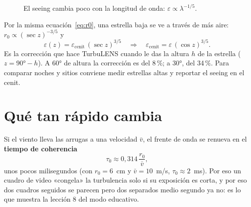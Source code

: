\begin{figure}[H]
\centering
{}
\caption{El seeing cambia poco con la longitud de onda: $\varepsilon \propto \lambda^{-1/5}$.}
\end{figure}

Por la misma ecuación~\eqref{eq:r0}, una estrella baja se ve a través de más aire: $r_0 \propto (\sec z)^{-3/5}$ y
\begin{equation}
\varepsilon(z) = \varepsilon_\text{cenit}\,(\sec z)^{3/5}
\quad\Longrightarrow\quad
\varepsilon_\text{cenit} = \varepsilon\,(\cos z)^{3/5} .
\end{equation}
Es la corrección que hace TurbuLENS cuando le das la altura $h$ de la estrella ($z = 90° - h$). A 60° de altura la
corrección es del 8\,\%; a 30°, del 34\,\%. Para comparar noches y sitios conviene medir estrellas altas y reportar el
seeing en el cenit.

\section{Qué tan rápido cambia}

Si el viento lleva las arrugas a una velocidad $\bar v$, el frente de onda se renueva en el \textbf{tiempo de
coherencia}
\begin{equation}
\tau_0 \approx 0{,}314\,\frac{r_0}{\bar v} ,
\end{equation}
unos pocos milisegundos (con $r_0 = 6$~cm y $\bar v = 10$~m/s, $\tau_0 \approx 2$~ms). Por eso un cuadro de video
«congela» la turbulencia solo si su exposición es corta, y por eso dos cuadros seguidos se parecen pero dos separados
medio segundo ya no: es lo que muestra la lección 8 del modo educativo.
